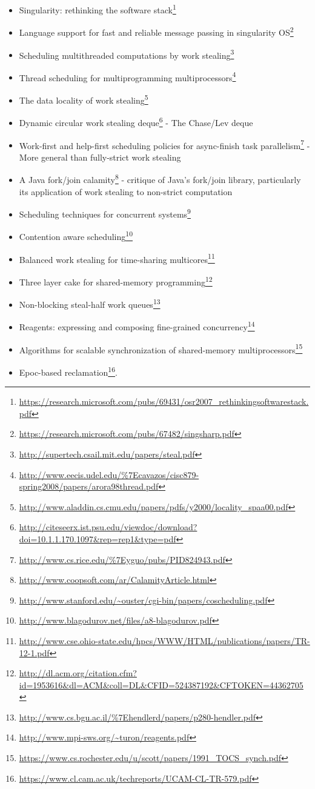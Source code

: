 \documentclass[a4paper,]{book}
\renewcommand{\href}[2]{#2\footnote{\url{#1}}}
\providecommand{\tightlist}{%
  \setlength{\itemsep}{0pt}\setlength{\parskip}{0pt}}
\begin{document}
\begin{itemize}
\tightlist
\item
  \href{https://research.microsoft.com/pubs/69431/osr2007_rethinkingsoftwarestack.pdf}{Singularity:
  rethinking the software stack}
\item
  \href{https://research.microsoft.com/pubs/67482/singsharp.pdf}{Language
  support for fast and reliable message passing in singularity OS}
\item
  \href{http://supertech.csail.mit.edu/papers/steal.pdf}{Scheduling
  multithreaded computations by work stealing}
\item
  \href{http://www.eecis.udel.edu/\%7Ecavazos/cisc879-spring2008/papers/arora98thread.pdf}{Thread
  scheduling for multiprogramming multiprocessors}
\item
  \href{http://www.aladdin.cs.cmu.edu/papers/pdfs/y2000/locality_spaa00.pdf}{The
  data locality of work stealing}
\item
  \href{http://citeseerx.ist.psu.edu/viewdoc/download?doi=10.1.1.170.1097\&rep=rep1\&type=pdf}{Dynamic
  circular work stealing deque} - The Chase/Lev deque
\item
  \href{http://www.cs.rice.edu/\%7Eyguo/pubs/PID824943.pdf}{Work-first
  and help-first scheduling policies for async-finish task parallelism}
  - More general than fully-strict work stealing
\item
  \href{http://www.coopsoft.com/ar/CalamityArticle.html}{A Java
  fork/join calamity} - critique of Java's fork/join library,
  particularly its application of work stealing to non-strict
  computation
\item
  \href{http://www.stanford.edu/~ouster/cgi-bin/papers/coscheduling.pdf}{Scheduling
  techniques for concurrent systems}
\item
  \href{http://www.blagodurov.net/files/a8-blagodurov.pdf}{Contention
  aware scheduling}
\item
  \href{http://www.cse.ohio-state.edu/hpcs/WWW/HTML/publications/papers/TR-12-1.pdf}{Balanced
  work stealing for time-sharing multicores}
\item
  \href{http://dl.acm.org/citation.cfm?id=1953616\&dl=ACM\&coll=DL\&CFID=524387192\&CFTOKEN=44362705}{Three
  layer cake for shared-memory programming}
\item
  \href{http://www.cs.bgu.ac.il/\%7Ehendlerd/papers/p280-hendler.pdf}{Non-blocking
  steal-half work queues}
\item
  \href{http://www.mpi-sws.org/~turon/reagents.pdf}{Reagents: expressing
  and composing fine-grained concurrency}
\item
  \href{https://www.cs.rochester.edu/u/scott/papers/1991_TOCS_synch.pdf}{Algorithms
  for scalable synchronization of shared-memory multiprocessors}
\item
  \href{https://www.cl.cam.ac.uk/techreports/UCAM-CL-TR-579.pdf}{Epoc-based
  reclamation}.
\end{itemize}
\end{document}
